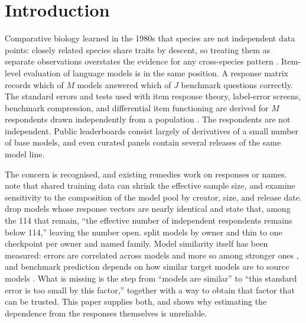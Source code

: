 \documentclass[10pt]{article}
\theoremstyle{remark}\newtheorem{remark}{Remark}
\begin{document}
\section{Introduction}
Comparative biology learned in the 1980s that species are not independent data
points: closely related species share traits by descent, so treating them as
separate observations overstates the evidence for any cross-species pattern
\citep{felsenstein1985phylogenies}. Item-level evaluation of language models is
in the same position. A response matrix records which of $M$ models answered
which of $J$ benchmark questions correctly. The standard errors and tests used
with item response theory, label-error screens, benchmark compression, and
differential item functioning are derived for $M$ respondents drawn
independently from a population
\citep{polo2024tinybenchmarks,kipnis2025metabench,truong2025fantastic,land2026auditing,dif2026llm}.
The respondents are not independent. Public leaderboards consist largely of
derivatives of a small number of base models, and even curated panels contain
several releases of the same model line.

The concern is recognised, and existing remedies work on responses or names.
\citet{truong2025fantastic} note that shared training data can shrink the
effective sample size, and examine sensitivity to the composition of the model
pool by creator, size, and release date. \citet{land2026auditing} drop models
whose response vectors are nearly identical and state that, among the 114 that
remain, ``the effective number of independent respondents remains below 114,''
leaving the number open. \citet{neartied2026rankings} split models by owner
and thin to one checkpoint per owner and named family. Model similarity itself
has been measured: errors are correlated across models and more so among
stronger ones \citep{kim2025correlated,goel2025great}, and benchmark
prediction depends on how similar target models are to source models
\citep{zhang2025benchmarkprediction}. What is missing is the step from
``models are similar'' to ``this standard error is too small by this factor,''
together with a way to obtain that factor that can be trusted. This paper
supplies both, and shows why estimating the dependence from the responses
themselves is unreliable.
\end{document}
